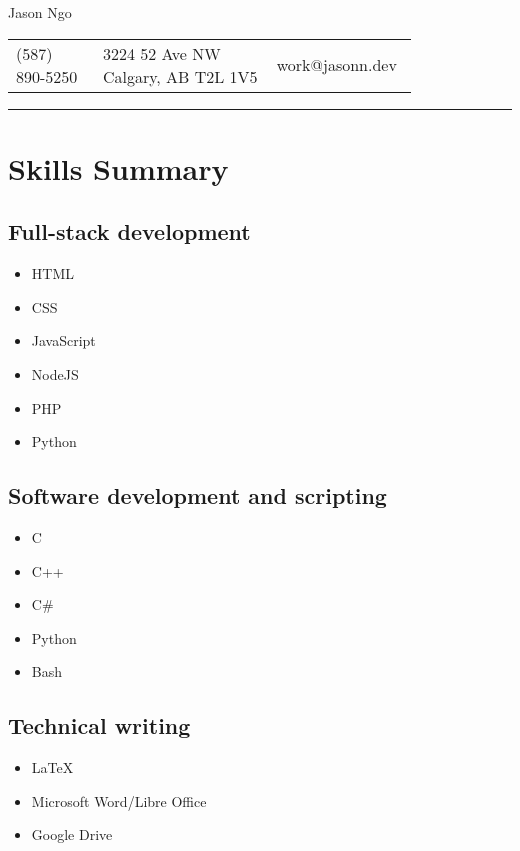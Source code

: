 \documentclass[letterpaper]{article}
\begin{document}
    \begin{center}
        \Large
        Jason Ngo

        \normalsize
        \begin{tabular}{m{0.2\linewidth}m{0.4\linewidth}m{0.2\linewidth}}
            (587) 890-5250 &
            3224 52 Ave NW Calgary, AB T2L 1V5 &
            work@jasonn.dev
        \end{tabular}
        \rule{\linewidth}{0.4pt}
    \end{center}

    \section*{Skills Summary}
        \subsection*{Full-stack development}

        \begin{itemize}
            \item HTML
            \item CSS
            \item JavaScript
            \item NodeJS
            \item PHP
            \item Python
        \end{itemize}

        \subsection*{Software development and scripting}

        \begin{itemize}
            \item C
            \item C++
            \item C\#
            \item Python
            \item Bash
        \end{itemize}

        \subsection*{Technical writing}

        \begin{itemize}
            \item LaTeX
            \item Microsoft Word/Libre Office
            \item Google Drive
        \end{itemize}
\end{document}
